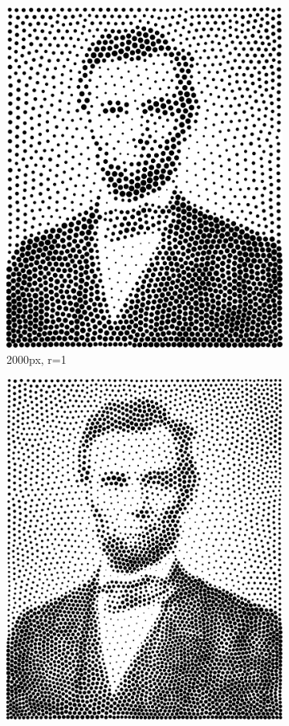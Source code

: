 \documentclass[11pt]{article}
\begin{document}
\begin{figure}[H]
\begin{subfigure}[b]{0.2\linewidth}
		\includegraphics[width=\linewidth]{pix/vr_AL_2000_r1.png}
		\caption{2000px, r=1}
	\end{subfigure}
	\begin{subfigure}[b]{0.2\linewidth}
		\includegraphics[width=\linewidth]{pix/vr_AL_4000_r1.png}

\end{subfigure}
\end{figure}
\end{document}
